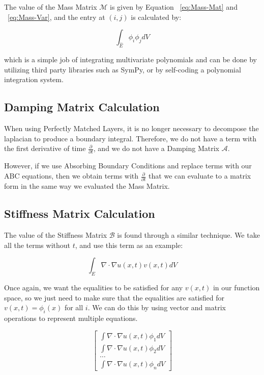 The value of the Mass Matrix $\mathcal{M}$ is given by Equation ~\ref{eq:Mass-Mat} and ~\ref{eq:Mass-Var}, and the entry at $(i,j)$ is calculated by:

\begin{equation}
\label{eq:Mass-Eq}
\int_{\hat{E}} \phi_i \phi_j dV
\end{equation}

which is a simple job of integrating multivariate polynomials and can be done by utilizing third party libraries such as SymPy, or by self-coding a polynomial integration system.
 
\subsection{Damping Matrix Calculation}

When using Perfectly Matched Layers, it is no longer necessary to decompose the laplacian to produce a boundary integral. Therefore, we do not have a term with the first derivative of time $\frac{\partial}{\partial t}$, and we do not have a Damping Matrix $\mathcal{A}$.

However, if we use Absorbing Boundary Conditions and replace terms with our ABC equations, then we obtain terms with $\frac{\partial}{\partial t}$ that we can evaluate to a matrix form in the same way we evaluated the Mass Matrix.

\subsection{Stiffness Matrix Calculation}

The value of the Stiffness Matrix $\mathcal{B}$ is found through a similar technique. We take all the terms without $t$, and use this term as an example:

\begin{equation}
\int_E \nabla \cdot \nabla u(x,t) v(x,t) dV
\end{equation}

Once again, we want the equalities to be satisfied for any $v(x,t)$ in our function space, so we just need to make sure that the equalities are satisfied for $v(x,t) = \phi_i(x)$ for all $i$. We can do this by using vector and matrix operations to represent multiple equations.

\begin{equation}
\begin{bmatrix}
\int \nabla \cdot \nabla u(x,t) \phi_1 dV \\
\int \nabla \cdot \nabla u(x,t) \phi_2 dV \\
\ldots \\
\int \nabla \cdot \nabla u(x,t) \phi_n dV
\end{bmatrix}
\end{equation}


